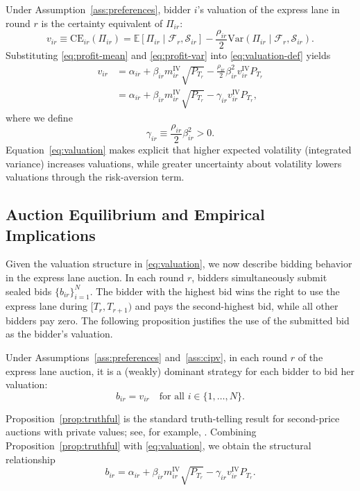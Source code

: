 \documentclass[runningheads]{llncs}
\newcommand{\E}{\mathbb{E}}
\newcommand{\Var}{\mathrm{Var}}
\newcommand{\CE}{\mathrm{CE}}
\newcommand{\IV}{\mathrm{IV}}
\begin{document}
Under Assumption~\ref{ass:preferences}, bidder $i$'s valuation of the express lane in round $r$ is the certainty equivalent of $\Pi_{ir}$:
\begin{equation}\label{eq:valuation-def}
  v_{ir}
  \equiv \CE_{ir}(\Pi_{ir})
  = \E\!\left[\Pi_{ir} \mid \mathcal F_r, \mathcal S_{ir} \right]
    - \frac{\rho_{ir}}{2}
      \Var\!\left(\Pi_{ir} \mid \mathcal F_r, \mathcal S_{ir} \right).
\end{equation}
Substituting \eqref{eq:profit-mean} and \eqref{eq:profit-var} into
\eqref{eq:valuation-def} yields
\begin{align}
  v_{ir}
    &= \alpha_{ir}
       + \beta_{ir} m^{\IV}_{ir} \sqrt{P_{T_r}}
       - \frac{\rho_{ir}}{2} \beta_{ir}^2 v^{\IV}_{ir} P_{T_r} \nonumber \\
    &= \alpha_{ir}
       + \beta_{ir} m^{\IV}_{ir} \sqrt{P_{T_r}}
       - \gamma_{ir} v^{\IV}_{ir} P_{T_r},
       \label{eq:valuation}
\end{align}
where we define
\[
  \gamma_{ir} \equiv \frac{\rho_{ir}}{2} \beta_{ir}^2 > 0.
\]
Equation~\eqref{eq:valuation} makes explicit that higher expected volatility (integrated variance) increases valuations, while greater uncertainty about volatility lowers valuations through the risk-aversion term.

\subsection{Auction Equilibrium and Empirical Implications}

Given the valuation structure in \eqref{eq:valuation}, we now describe bidding behavior in the express lane auction. In each round $r$, bidders simultaneously submit sealed bids $\{b_{ir}\}_{i=1}^N$. The bidder with the highest bid wins the right to use the express lane during $[T_r, T_{r+1})$ and pays the second-highest bid, while all other bidders pay zero. The following proposition justifies the use of the submitted bid as the bidder's valuation.

\begin{prop}\label{prop:truthful}
Under Assumptions~\ref{ass:preferences} and~\ref{ass:cipv}, in each round $r$ of the express lane auction, it is a (weakly) dominant strategy for each bidder to bid her valuation:
\[
  b_{ir} = v_{ir} \quad \text{for all } i \in \{1,\dots,N\}.
\]
\end{prop}

Proposition~\ref{prop:truthful} is the standard truth-telling result for second-price auctions with private values; see, for example, \cite{krishna2009auction}. Combining Proposition~\ref{prop:truthful} with \eqref{eq:valuation}, we obtain the structural relationship
\begin{equation}\label{eq:structural-bid}
  b_{ir}
  = \alpha_{ir}
    + \beta_{ir} m^{\IV}_{ir} \sqrt{P_{T_r}}
    - \gamma_{ir} v^{\IV}_{ir} P_{T_r}.
\end{equation}
\end{document}
